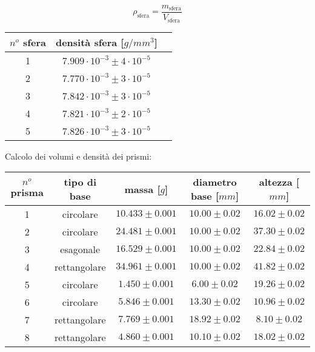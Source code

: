 \documentclass[8pt]{article}
\begin{document}
\begin{displaymath}
\rho_{\text{sfera}} = \frac{m_{\text{sfera}}}{V_{\text{sfera}}}
\end{displaymath}

\smallskip

\begin{center}
\begin{tabular}{ c c c }
\toprule
$n^o$ sfera & densità sfera [$g/mm^3$] \\
\midrule
1 & $7.909 \cdot 10^{-3} \pm 4 \cdot 10^{-5}$ \\
2 & $7.770 \cdot 10^{-3} \pm 3 \cdot 10^{-5}$ \\
3 & $7.842 \cdot 10^{-3} \pm 3 \cdot 10^{-5}$ \\
4 & $7.821 \cdot 10^{-3} \pm 2 \cdot 10^{-5}$ \\
5 & $7.826 \cdot 10^{-3} \pm 3 \cdot 10^{-5}$ \\
\bottomrule
\end{tabular}
\end{center} 

\pagebreak

Calcolo dei volumi e densità dei prismi:

\begin{center}
\begin{tabular}{ c c c c c }
\toprule
$n^o$ prisma & tipo di base & massa [$g$] & diametro base [$mm$] & altezza [$mm$]\\
\midrule
1 & circolare & $10.433 \pm 0.001$ & $10.00 \pm 0.02$ & $16.02 \pm 0.02$ \\
2 & circolare & $24.481 \pm 0.001$ & $10.00 \pm 0.02$ & $37.30 \pm 0.02$\\
3 & esagonale & $16.529 \pm 0.001$ & $10.00 \pm 0.02$ & $22.84 \pm 0.02$ \\
4 & rettangolare & $34.961 \pm 0.001$ & $10.00 \pm 0.02$ & $41.82 \pm 0.02$  \\
5 & circolare & $1.450 \pm 0.001$ & $6.00 \pm 0.02$ & $19.26 \pm 0.02$  \\
6 & circolare & $5.846 \pm 0.001$ & $13.30 \pm 0.02$ & $10.96 \pm 0.02$  \\
7 & rettangolare & $7.769 \pm 0.001$ & $18.92 \pm 0.02$ & $8.10 \pm 0.02$  \\
8 & rettangolare & $4.860 \pm 0.001$ & $10.10 \pm 0.02$ & $18.02 \pm 0.02$  \\
\bottomrule
\end{tabular}
\end{center}

\smallskip
\end{document}
